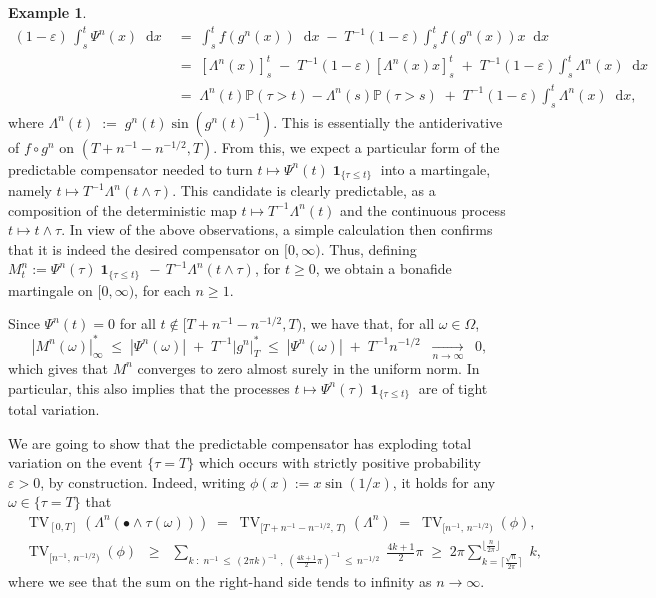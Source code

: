 \documentclass[11pt]{article}
\theoremstyle{definition}\newtheorem{example}[theorem]{Example}
\theoremstyle{definition}\newtheorem{counterexample}[theorem]{Counterexample}
\theoremstyle{definition}\newtheorem{remark}[theorem]{Remark}
\theoremstyle{definition}\newtheorem{defi}[theorem]{Definition}
\numberwithin{equation}{section}
\newcommand*\diff{\mathop{}\!\mathrm{d}}								%
\newcommand{\Pro}{\mathbb{P}}										%
\newcommand{\ind}{\operatorname{\mathbf{1}}}							%
\renewcommand{\|}{\; : \, \;}											%
\newcommand{\conv}[2]{\; \xrightarrow[ {#1}]{#2} \; }						%
\begin{document}
\begin{example}
	\begin{align*}
		(1-\varepsilon) \, \int_s^t \Psi^n(x) \diff x  \; &= \;  \int_s^t f(g^n(x)) \diff x \; - \;  T^{-1}(1-\varepsilon) \int_s^t f(g^n(x))  x   \diff x \\
		&= \;  [\Lambda^n(x)]^t_s \; - \;  T^{-1}(1-\varepsilon)[\Lambda^n(x) x]^t_s \; + \; T^{-1}(1-\varepsilon) \int_s^t \Lambda^n(x) \diff x \\
		&= \; \Lambda^n(t)\Pro(\tau >t) - \Lambda^n(s)\Pro(\tau>s) \; + \; T^{-1}(1-\varepsilon) \int_s^t  \Lambda^n(x) \diff x,
	\end{align*}
	where
	$\Lambda^n(t) \; := \; g^n(t) \sin(g^n(t)^{-1})$. This
	is essentially the antiderivative of $f\circ g^n$ on $(T+n^{-1}-n^{-1/2},T)$. From this, we expect a particular form of the predictable compensator needed to turn $t\mapsto \Psi^n(t) \ind_{\{\tau \le t\}}$ into a martingale, namely $t\mapsto T^{-1} \Lambda^n(t\wedge \tau)$. This candidate is clearly predictable, as a composition of the deterministic map $t\mapsto T^{-1}\Lambda^n(t)$ and the continuous process $t\mapsto t\wedge \tau$. In view of the above observations, a simple calculation then confirms that it is indeed the desired compensator on $[0,\infty)$. Thus, defining $M^n_t:= \Psi^n(\tau) \ind_{\{\tau \le t\}} \, - \, T^{-1}\Lambda^n(t\wedge \tau)$, for $t\geq0$, we obtain a bonafide martingale on $[0,\infty)$, for each $n\geq 1$.
	
	Since $\Psi^n(t)=0$ for all $t \notin [T+n^{-1}-n^{-1/2},T)$, we have that, for all $\omega \in \Omega$, 
	$$ |M^n(\omega)|^*_\infty \; \le \; |\Psi^n(\omega)| \; + \; T^{-1}|g^n|^*_T \; \le \; |\Psi^n(\omega)| \; + \; T^{-1} n^{-1/2} \; \conv{n\to \infty} \; \; 0,$$
	which gives that $M^n$ converges to zero almost surely in the uniform norm. In particular, this also implies that the processes $t \mapsto  \Psi^n(\tau) \ind_{\{\tau \le t\}}$ are of tight total variation.
	
	We are going to show that the predictable compensator has exploding total variation on the event $\{\tau=T\}$ which occurs with strictly positive probability $\varepsilon>0$, by construction. Indeed, writing $\phi(x):= x \sin(1/x)$, it holds for any $\omega \in \{\tau=T\}$ that
	\begin{align*}
		&\operatorname{TV}_{[0,T]}(\Lambda^n(\bullet \wedge \tau(\omega)))\; = \; \operatorname{TV}_{[T+n^{-1}-n^{-1/2}, \, T)}(\Lambda^n)\;  = \; \operatorname{TV}_{[n^{-1}, \, n^{-1/2})}(\phi), \\
		&\operatorname{TV}_{[n^{-1}, \, n^{-1/2})}(\phi)\; \; \ge \; \; \sum_{k\; : \; n^{-1} \, \le \, (2\pi k)^{-1}\; , \; (\frac{4k+1}{2} \pi)^{-1}\, \le \, n^{-1/2}} \; \frac{4k+1}{2} \pi \; \ge \; 2\pi \sum_{k= \lceil \frac{\sqrt{n}}{2\pi}\rceil  }^{\lfloor \frac{n}{2\pi}\rfloor} \; k,
	\end{align*}
	where we see that the sum on the right-hand side tends to infinity as $n\to \infty$.
	

\end{example}
\end{document}

